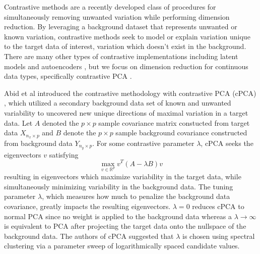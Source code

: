 \documentclass[12pt]{article}
\begin{document}

Contrastive methods are a recently developed class of procedures for simultaneously removing unwanted variation while performing dimension reduction. By leveraging a background dataset that represents unwanted or known variation, contrastive methods seek to model or explain variation unique to the target data of interest, variation which doesn't exist in the background. There are many other types of contrastive implementations including latent models  \cite{severson2019unsupervised} and autoencoders  \cite{cautoencoder}, but we focus on dimension reduction for continuous data types, specifically contrastive PCA \cite{Abid}.


        
   Abid et al introduced the contrastive methodology with contrastive PCA (cPCA) \cite{Abid}, which utilized a secondary background data set of known and unwanted variability to uncovered new unique directions of maximal variation in a target data.
   Let $A$ denoted the $p\times p$ sample covariance matrix constucted from target data $X_{n_x \times p}$ and $B$ denote the $p\times p$ sample background covariance constructed from background data $Y_{n_y \times p}$. For some contrastive parameter $\lambda$, cPCA seeks the eigenvectors $v$ satisfying \[\max_{v\in \mathbb{R}^p}v^T\left(A - \lambda B\right)v\] 
   resulting in eigenvectors which maximize variability in the target data, while simultaneously minimizing variability in the background data.
   The tuning parameter $\lambda$, which measures how much to penalize the background data covariance, greatly impacts the resulting eigenvectors. $\lambda = 0$ reduces cPCA to normal PCA since no weight is applied to the background data whereas a $\lambda \rightarrow \infty$ is equivalent to PCA after projecting the target data onto the nullspace of the background data.  The authors of cPCA suggested that $\lambda$ is chosen using spectral clustering via a parameter sweep of logarithmically spaced candidate values.
\end{document}
